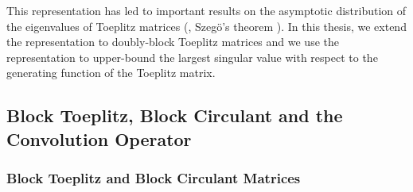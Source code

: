 This representation has led to important results on the asymptotic distribution of the eigenvalues of Toeplitz matrices (\eg, Szeg\"{o}'s theorem \cite{szego1915grenzwertsatz}).
In this thesis, we extend the representation to doubly-block Toeplitz matrices and we use the representation to upper-bound the largest singular value with respect to the generating function of the Toeplitz matrix.





\subsection{Block Toeplitz, Block Circulant and the Convolution Operator}
\label{subsection:ch2-block_toeplitz_and_block_circulant_matrices}

\subsubsection{Block Toeplitz and Block Circulant Matrices}
\label{subsubsection:ch2-block_circulant_and_block_toeplitz_matrices}


